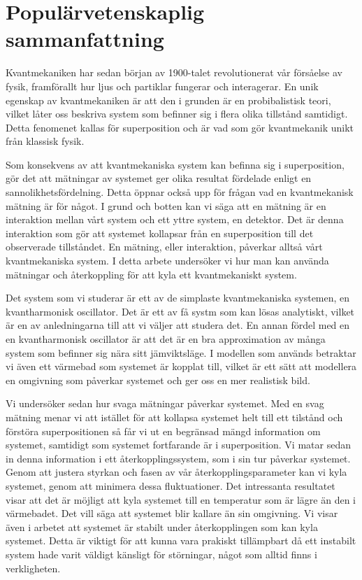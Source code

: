 \section*{Populärvetenskaplig sammanfattning}
Kvantmekaniken har sedan början av 1900-talet revolutionerat vår försåelse av fysik, framförallt hur ljus och partiklar fungerar och interagerar. En unik egenskap av kvantmekaniken är att den i grunden är en probibalistisk teori, vilket låter oss beskriva system som befinner sig i flera olika tillstånd samtidigt. Detta fenomenet kallas för superposition och är vad som gör kvantmekanik unikt från klassisk fysik. 

Som konsekvens av att kvantmekaniska system kan befinna sig i superposition, gör det att mätningar av systemet ger olika resultat fördelade enligt en sannolikhetsfördelning. Detta öppnar också upp för frågan vad en kvantmekanisk mätning är för något. I grund och botten kan vi säga att en mätning är en interaktion mellan vårt system och ett yttre system, en detektor. Det är denna interaktion som gör att systemet kollapsar från en superposition till det observerade tillståndet. En mätning, eller interaktion, påverkar alltså vårt kvantmekaniska system. I detta arbete undersöker vi hur man kan använda mätningar och återkoppling för att kyla ett kvantmekaniskt system.

Det system som vi studerar är ett av de simplaste kvantmekaniska systemen, en kvantharmonisk oscillator. Det är ett av få systm som kan lösas analytiskt, vilket är en av anledningarna till att vi väljer att studera det. En annan fördel med en en kvantharmonisk oscillator är att det är en bra approximation av många system som befinner sig nära sitt jämviktsläge. I modellen som används betraktar vi även ett värmebad som systemet är kopplat till, vilket är ett sätt att modellera en omgivning som påverkar systemet och ger oss en mer realistisk bild.

Vi undersöker sedan hur svaga mätningar påverkar systemet. Med en svag mätning menar vi att istället för att kollapsa systemet helt till ett tilstånd och förstöra superpositionen så får vi ut en begränsad mängd information om systemet, samtidigt som systemet fortfarande är i superposition. Vi matar sedan in denna information i ett återkopplingssystem, som i sin tur påverkar systemet. Genom att justera styrkan och fasen av vår återkopplingsparameter kan vi kyla systemet, genom att minimera dessa fluktuationer. Det intressanta resultatet visar att det är möjligt att kyla systemet till en temperatur som är lägre än den i värmebadet. Det vill säga att systemet blir kallare än sin omgivning. Vi visar även i arbetet att systemet är stabilt under återkopplingen som kan kyla systemet. Detta är viktigt för att kunna vara prakiskt tillämpbart då ett instabilt system hade varit väldigt känsligt för störningar, något som alltid finns i verkligheten.

